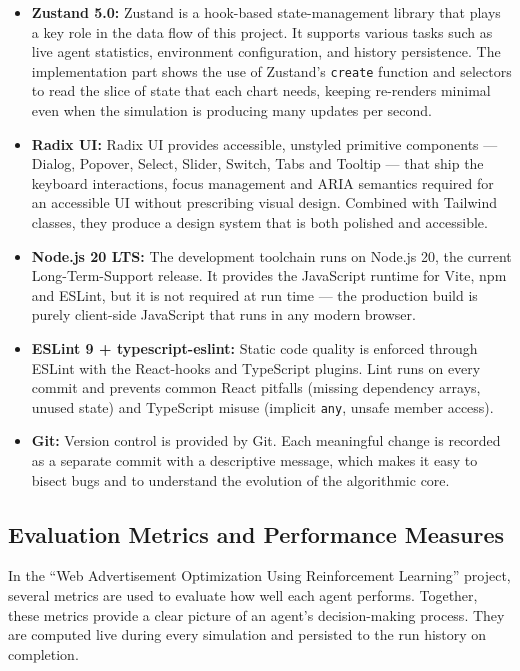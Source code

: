 \begin{itemize}
\item \textbf{Zustand 5.0:} Zustand is a hook-based state-management library that plays a key role in the data flow of this project. It supports various tasks such as live agent statistics, environment configuration, and history persistence. The implementation part shows the use of Zustand's \texttt{create} function and selectors to read the slice of state that each chart needs, keeping re-renders minimal even when the simulation is producing many updates per second.

\item \textbf{Radix UI:} Radix UI provides accessible, unstyled primitive components --- Dialog, Popover, Select, Slider, Switch, Tabs and Tooltip --- that ship the keyboard interactions, focus management and ARIA semantics required for an accessible UI without prescribing visual design. Combined with Tailwind classes, they produce a design system that is both polished and accessible.

\item \textbf{Node.js 20 LTS:} The development toolchain runs on Node.js 20, the current Long-Term-Support release. It provides the JavaScript runtime for Vite, npm and ESLint, but it is not required at run time --- the production build is purely client-side JavaScript that runs in any modern browser.

\item \textbf{ESLint 9 + typescript-eslint:} Static code quality is enforced through ESLint with the React-hooks and TypeScript plugins. Lint runs on every commit and prevents common React pitfalls (missing dependency arrays, unused state) and TypeScript misuse (implicit \texttt{any}, unsafe member access).

\item \textbf{Git:} Version control is provided by Git. Each meaningful change is recorded as a separate commit with a descriptive message, which makes it easy to bisect bugs and to understand the evolution of the algorithmic core.
\end{itemize}

\subsection{Evaluation Metrics and Performance Measures}
In the ``Web Advertisement Optimization Using Reinforcement Learning'' project, several metrics are used to evaluate how well each agent performs. Together, these metrics provide a clear picture of an agent's decision-making process. They are computed live during every simulation and persisted to the run history on completion.


